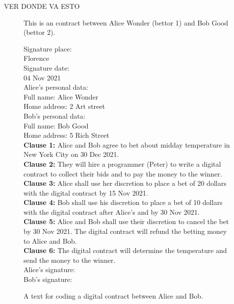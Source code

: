 \documentclass[12pt]{report} %
\begin{document}
VER DONDE VA ESTO

  
    
    

\begin{figure}
\begin{tcolorbox}[width=\textwidth,
   title={Alice and Bob bet about the weather.},
   colframe=black!75!white,
   colbacktitle=red!50!white, coltitle=black,
   colupper=black,    colback=red!5!white]

 This is an contract between Alice Wonder (bettor 1) 
 and Bob Good (bettor 2). 

\vspace{0.5cm}
Signature place: \\ 
Florence\\

Signature date:\\ 
04 Nov 2021 \\

 Alice's personal data: \\
Full name:  Alice Wonder \\ 
Home address: 2 Art street \\

 Bob's personal data: \\
Full name: Bob Good \\
Home address: 5 Rich Street \\



\textbf{Clause 1:} Alice and Bob agree to bet about midday temperature in New York City on 30 Dec 2021.\\
 

\textbf{Clause 2:} They will hire a programmer (Peter) to write a digital contract to collect their bids and to pay the money to the winner.\\

\textbf{Clause 3:} Alice shall use her discretion to place a bet of
20 dollars  with the digital contract by 15 Nov 2021.\\

\textbf{Clause 4:} Bob shall use his discretion to place a bet of
10 dollars with the digital contract after Alice's and by 30 Nov 2021.\\

\textbf{Clause 5:} Alice and Bob shall use their discretion to cancel the bet by 30 Nov 2021. The digital contract will refund the betting money to Alice and Bob. \\


\textbf{Clause 6:} The digital contract will determine the temperature and send the money to the winner. \\

\vspace{0.5 cm}
Alice's signature:  \\
      
Bob's signature: 

\end{tcolorbox}
\caption{A text for coding a digital contract between Alice and Bob.}
\label{box:contAliceBobbet}
\end{figure}
 
\end{document}
